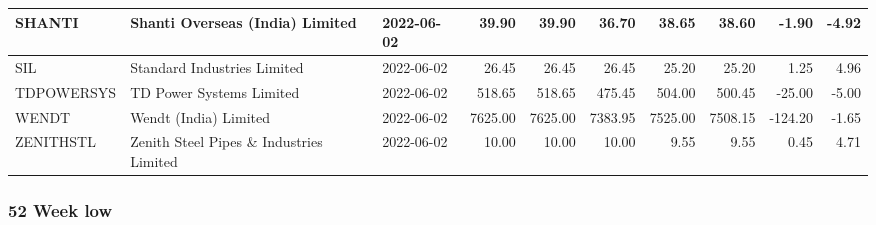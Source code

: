 \documentclass[
]{article}
\begin{document}
\begin{table}
\begin{tabular}{l|l|l|r|r|r|r|r|r|r}
\hline
SHANTI & Shanti Overseas (India) Limited & 2022-06-02 & 39.90 & 39.90 & 36.70 & 38.65 & 38.60 & -1.90 & -4.92\\
\hline
SIL & Standard Industries Limited & 2022-06-02 & 26.45 & 26.45 & 26.45 & 25.20 & 25.20 & 1.25 & 4.96\\
\hline
TDPOWERSYS & TD Power Systems Limited & 2022-06-02 & 518.65 & 518.65 & 475.45 & 504.00 & 500.45 & -25.00 & -5.00\\
\hline
WENDT & Wendt (India) Limited & 2022-06-02 & 7625.00 & 7625.00 & 7383.95 & 7525.00 & 7508.15 & -124.20 & -1.65\\
\hline
ZENITHSTL & Zenith Steel Pipes \& Industries Limited & 2022-06-02 & 10.00 & 10.00 & 10.00 & 9.55 & 9.55 & 0.45 & 4.71\\
\hline
\end{tabular}
\endgroup{}
\end{table}

\hypertarget{week-low}{%
\subsubsection{52 Week low}\label{week-low}}
\end{document}
